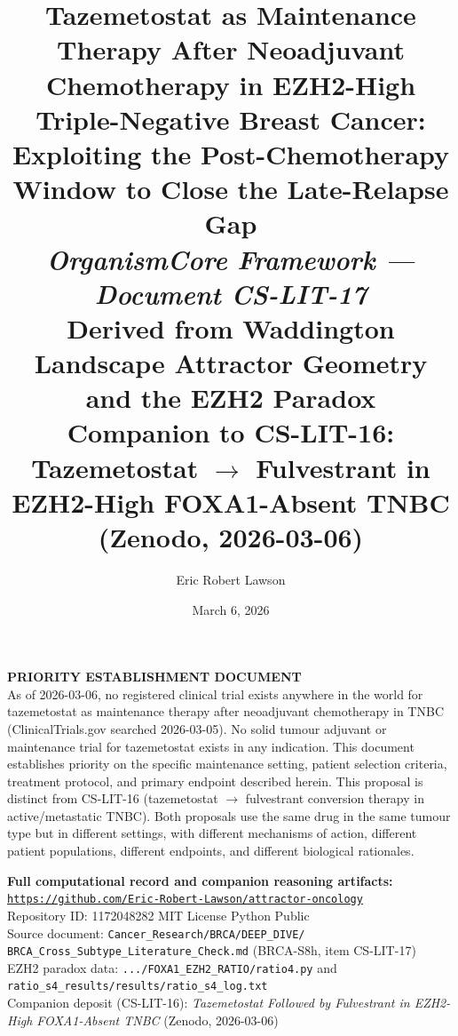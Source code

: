 \documentclass[12pt, a4paper]{article}
\title{
    \vspace{-1em}
    \textbf{Tazemetostat as Maintenance Therapy
    After Neoadjuvant Chemotherapy in EZH2-High
    Triple-Negative Breast Cancer:}\\[0.5em]
    \large Exploiting the Post-Chemotherapy Window
    to Close the Late-Relapse Gap\\[0.4em]
    \normalsize \textit{OrganismCore Framework ---
    Document CS-LIT-17}\\[0.3em]
    \small Derived from Waddington Landscape Attractor
    Geometry and the EZH2 Paradox\\[0.3em]
    \small Companion to CS-LIT-16:
    Tazemetostat $\rightarrow$ Fulvestrant
    in EZH2-High FOXA1-Absent TNBC
    (Zenodo, 2026-03-06)
}
\author[1]{Eric Robert Lawson}
\affil[1]{
    OrganismCore\\
    \href{mailto:OrganismCore@proton.me}
         {OrganismCore@proton.me}\\
    ORCID:
    \href{https://orcid.org/0009-0002-0414-6544}
         {0009-0002-0414-6544}
}
\date{March 6, 2026}
\begin{document}

\maketitle
\thispagestyle{fancy}

\begin{center}
\colorbox{urgentbox}{
\begin{minipage}{0.88\textwidth}
\vspace{0.5em}
\centering
\textbf{PRIORITY ESTABLISHMENT DOCUMENT}\\[0.3em]
\small
As of 2026-03-06, no registered clinical trial exists
anywhere in the world for tazemetostat as maintenance
therapy after neoadjuvant chemotherapy in TNBC
(ClinicalTrials.gov searched 2026-03-05). No solid
tumour adjuvant or maintenance trial for tazemetostat
exists in any indication. This document establishes
priority on the specific maintenance setting, patient
selection criteria, treatment protocol, and primary
endpoint described herein. This proposal is distinct
from CS-LIT-16 (tazemetostat $\rightarrow$ fulvestrant
conversion therapy in active/metastatic TNBC). Both
proposals use the same drug in the same tumour type
but in different settings, with different mechanisms
of action, different patient populations, different
endpoints, and different biological rationales.
\vspace{0.5em}
\end{minipage}
}
\end{center}

\vspace{0.6em}

\begin{center}
\colorbox{repobox}{
\begin{minipage}{0.88\textwidth}
\vspace{0.4em}
\centering
\textbf{Full computational record and companion
reasoning artifacts:}\\[0.3em]
\href{https://github.com/Eric-Robert-Lawson/attractor-oncology}
{\texttt{https://github.com/Eric-Robert-Lawson/attractor-oncology}}
\\[0.2em]
\small
Repository ID: 1172048282 \textbar{}
MIT License \textbar{}
Python \textbar{}
Public\\[0.2em]
Source document:
\texttt{Cancer\_Research/BRCA/DEEP\_DIVE/}
\texttt{BRCA\_Cross\_Subtype\_Literature\_Check.md}
(BRCA-S8h, item CS-LIT-17)\\[0.2em]
EZH2 paradox data:
\texttt{.../FOXA1\_EZH2\_RATIO/ratio4.py}
and
\texttt{ratio\_s4\_results/results/ratio\_s4\_log.txt}\\[0.2em]
Companion deposit (CS-LIT-16):
\textit{Tazemetostat Followed by Fulvestrant in
EZH2-High FOXA1-Absent TNBC}
(Zenodo, 2026-03-06)
\vspace{0.4em}
\end{minipage}
}
\end{center}
\end{document}
